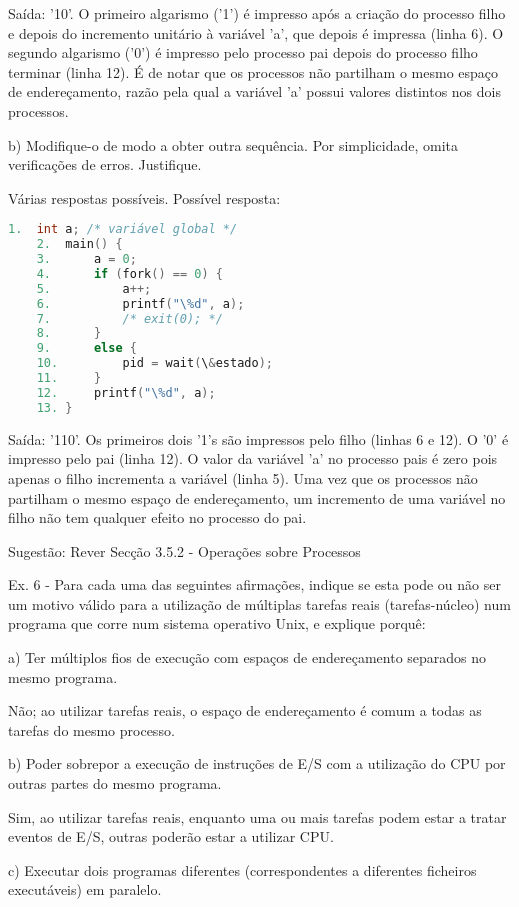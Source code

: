 \documentclass[11pt]{article}
\begin{document}
Saída: '10'. O primeiro algarismo ('1') é impresso após a criação do processo filho e depois do incremento unitário à variável 'a', que depois é impressa (linha 6). O segundo algarismo ('0') é impresso pelo processo pai depois do processo filho terminar (linha 12). É de notar que os processos não partilham o mesmo espaço de endereçamento, razão pela qual a variável 'a' possui valores distintos nos dois processos.

b) Modifique-o de modo a obter outra sequência. Por simplicidade, omita verificações de erros. Justifique.

Várias respostas possíveis. Possível resposta:

\begin{lstlisting}[language=C]
    1.  int a; /* variável global */
    2.  main() {
    3.      a = 0;
    4.      if (fork() == 0) {
    5.          a++;
    6.          printf("\%d", a);
    7.          /* exit(0); */
    8.      }
    9.      else {
    10.         pid = wait(\&estado);
    11.     }
    12.     printf("\%d", a);
    13. }
\end{lstlisting}

Saída: '110'. Os primeiros dois '1's são impressos pelo filho (linhas 6 e 12). O '0' é impresso pelo pai (linha 12). O valor da variável 'a' no processo pais é zero pois apenas o filho incrementa a variável (linha 5). Uma vez que os processos não partilham o mesmo espaço de endereçamento, um incremento de uma variável no filho não tem qualquer efeito no processo do pai.

Sugestão: Rever Secção 3.5.2 - Operações sobre Processos

Ex. 6 - Para cada uma das seguintes afirmações, indique se esta pode ou não ser um motivo válido para a utilização de múltiplas tarefas reais (tarefas-núcleo) num programa que corre num sistema operativo Unix, e explique porquê:

a) Ter múltiplos fios de execução com espaços de endereçamento separados no mesmo programa.

Não; ao utilizar tarefas reais, o espaço de endereçamento é comum a todas as tarefas do mesmo processo.

b) Poder sobrepor a execução de instruções de E/S com a utilização do CPU por outras partes do mesmo programa.

Sim, ao utilizar tarefas reais, enquanto uma ou mais tarefas podem estar a tratar eventos de E/S, outras poderão estar a utilizar CPU.

c) Executar dois programas diferentes (correspondentes a diferentes ficheiros executáveis) em paralelo.
\end{document}

